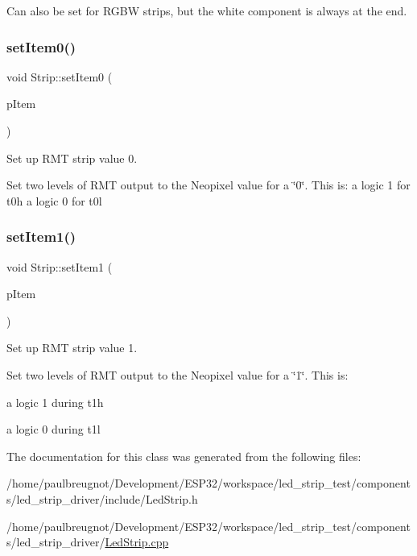 Can also be set for R\+G\+BW strips, but the white component is always at the end. \mbox{\label{classStrip_a379d65a972db69e2534955c364a01d35}} 
\subsubsection{\texorpdfstring{setItem0()}{setItem0()}}
{\footnotesize\ttfamily void Strip\+::set\+Item0 (\begin{DoxyParamCaption}\item[{rmt\+\_\+item32\+\_\+t $\ast$}]{p\+Item }\end{DoxyParamCaption})\hspace{0.3cm}{\ttfamily [protected]}}



Set up R\+MT strip value 0. 

Set two levels of R\+MT output to the Neopixel value for a \char`\"{}0\char`\"{}. This is\+: a logic 1 for t0h a logic 0 for t0l \mbox{\label{classStrip_a5f2b87e24509442384c120e27296da5e}} 
\subsubsection{\texorpdfstring{setItem1()}{setItem1()}}
{\footnotesize\ttfamily void Strip\+::set\+Item1 (\begin{DoxyParamCaption}\item[{rmt\+\_\+item32\+\_\+t $\ast$}]{p\+Item }\end{DoxyParamCaption})\hspace{0.3cm}{\ttfamily [protected]}}



Set up R\+MT strip value 1. 

Set two levels of R\+MT output to the Neopixel value for a \char`\"{}1\char`\"{}. This is\+:
\begin{DoxyItemize}
\item a logic 1 during t1h
\item a logic 0 during t1l 
\end{DoxyItemize}

The documentation for this class was generated from the following files\+:\begin{DoxyCompactItemize}
\item 
/home/paulbreugnot/\+Development/\+E\+S\+P32/workspace/led\+\_\+strip\+\_\+test/components/led\+\_\+strip\+\_\+driver/include/Led\+Strip.\+h\item 
/home/paulbreugnot/\+Development/\+E\+S\+P32/workspace/led\+\_\+strip\+\_\+test/components/led\+\_\+strip\+\_\+driver/\mbox{\hyperlink{LedStrip_8cpp}{Led\+Strip.\+cpp}}\end{DoxyCompactItemize}
